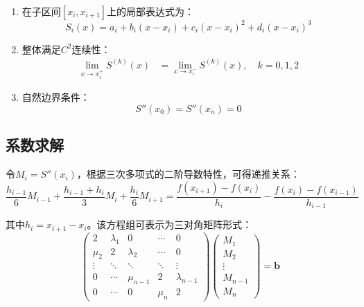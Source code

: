 \begin{enumerate}
    \item 在子区间$[x_i, x_{i+1}]$上的局部表达式为：
    \begin{equation}
        S_i(x) = a_i + b_i(x-x_i) + c_i(x-x_i)^2 + d_i(x-x_i)^3
    \end{equation}
    
    \item 整体满足$C^2$连续性：
    \begin{align}
        \lim_{x\to x_i^+} S^{(k)}(x) &= \lim_{x\to x_i^-} S^{(k)}(x), \quad k=0,1,2
    \end{align}
    
    \item 自然边界条件：
    \begin{equation}
        S''(x_0) = S''(x_n) = 0
    \end{equation}
\end{enumerate}

\subsection{系数求解}
令$M_i = S''(x_i)$，根据三次多项式的二阶导数特性，可得递推关系：
\begin{equation}
    \frac{h_{i-1}}{6}M_{i-1} + \frac{h_{i-1}+h_i}{3}M_i + \frac{h_i}{6}M_{i+1} = \frac{f(x_{i+1})-f(x_i)}{h_i} - \frac{f(x_i)-f(x_{i-1})}{h_{i-1}}
\end{equation}

其中$h_i = x_{i+1}-x_i$。该方程组可表示为三对角矩阵形式：
\begin{equation}
    \begin{pmatrix}
        2 & \lambda_1 & 0 & \cdots & 0 \\
        \mu_2 & 2 & \lambda_2 & \cdots & 0 \\
        \vdots & \ddots & \ddots & \ddots & \vdots \\
        0 & \cdots & \mu_{n-1} & 2 & \lambda_{n-1} \\
        0 & \cdots & 0 & \mu_n & 2
    \end{pmatrix}
    \begin{pmatrix}
        M_1 \\ M_2 \\ \vdots \\ M_{n-1} \\ M_n
    \end{pmatrix}
    = \mathbf{b}
\end{equation}

